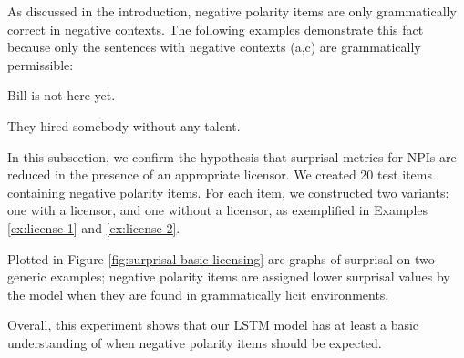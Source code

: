 \documentclass[11pt, round]{article}
\begin{document}
As discussed in the introduction, negative polarity items are only grammatically correct in negative contexts. The following examples demonstrate this fact because only the sentences with negative contexts (a,c) are grammatically permissible:
\begin{exe}
\ex\label{ex:license-1}
\begin{xlist}
\ex Bill is not here yet.
\end{xlist}
\ex\label{ex:license-2}
\begin{xlist}
\ex They hired somebody without any talent.
\end{xlist}
\end{exe}
In this subsection, we confirm the hypothesis that surprisal metrics for NPIs are reduced in the presence of an appropriate licensor. We created 20 test items containing negative polarity items. For each item, we constructed two variants: one with a licensor, and one without a licensor, as exemplified in Examples \ref{ex:license-1} and \ref{ex:license-2}.

Plotted in Figure \ref{fig:surprisal-basic-licensing} are graphs of surprisal on two generic examples; negative polarity items are assigned lower surprisal values by the model when they are found in grammatically licit environments. 

Overall, this experiment shows that our LSTM model has at least a basic understanding of when negative polarity items should be expected.
\end{document}
